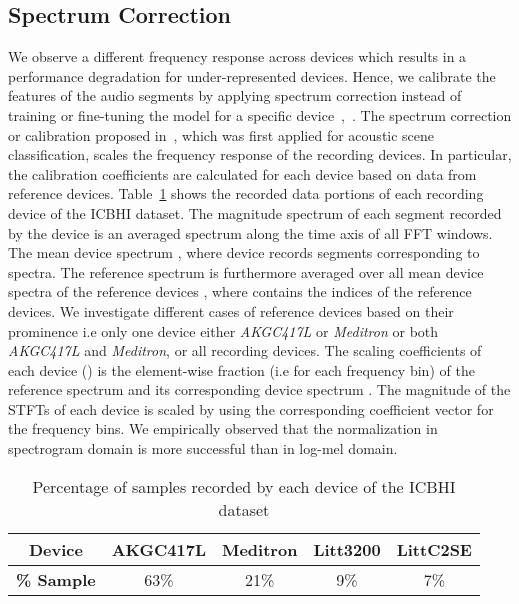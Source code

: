 \documentclass[journal]{IEEEtran}
\begin{document}
\subsection{Spectrum Correction}
We observe a different frequency response across devices which results in a performance degradation for under-represented devices. Hence, we calibrate the features of the audio segments by applying spectrum correction instead of training or fine-tuning the model for a specific device~\cite{kochetov2018noise},~\cite{gairola2020respirenet}. The spectrum correction or calibration proposed in~\cite{nguyen2020acoustic}, which was first applied for acoustic scene classification, scales the frequency response of the recording devices. In particular, the calibration coefficients are calculated for each device based on data from reference devices. Table~\ref{device_sample} shows the recorded data portions of each recording device of the ICBHI dataset. The magnitude spectrum  of each segment  recorded by the device  is an averaged spectrum along the time axis of all FFT windows. The mean device spectrum , where device  records  segments corresponding to  spectra. The reference spectrum  is furthermore averaged over all mean device spectra of the  reference devices , where  contains the indices of the reference devices. We investigate different cases of reference devices based on their prominence i.e only one device either \textit{AKGC417L} or \textit{Meditron} or both \textit{AKGC417L} and \textit{Meditron}, or all recording devices. The scaling coefficients of each device () is the element-wise fraction (i.e for each frequency bin) of the reference spectrum and its corresponding device spectrum . The magnitude of the STFTs of each device is scaled by using the corresponding coefficient vector  for the frequency bins. We empirically observed that the normalization in spectrogram domain is more successful than in log-mel domain.

\begin{table}[t]
    \renewcommand{\arraystretch}{1.3}
    \caption{Percentage of samples recorded by each device of the ICBHI dataset}
    \label{device_sample}
    \centering
    
    \begin{tabular}{c c c c c}
        \hline
        \textbf{Device} & \textbf{AKGC417L} & \textbf{Meditron} & \textbf{Litt3200} & \textbf{LittC2SE}\\
        \hline
        \textbf{\% Sample} & 63\% & 21\% & 9\% & 7\% \\
        \hline
    \end{tabular}
\end{table}
\end{document}
